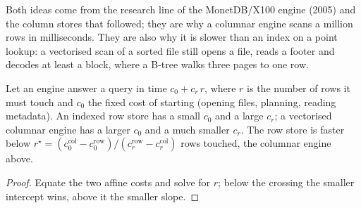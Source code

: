 Both ideas come from the research line of the MonetDB/X100 engine (2005) and the column stores that followed; they are why a
columnar engine scans a million rows in milliseconds. They are also why it is slower than an index on a point lookup: a
vectorised scan of a sorted file still opens a file, reads a footer and decodes at least a block, where a B-tree walks three
pages to one row.

\begin{omfigure}

\label{fig:pl:time-series-databases-and-the-alternatives:vector}
\end{omfigure}

\begin{proposition}\label{prop:pl:time-series-databases-and-the-alternatives:shapes}
Let an engine answer a query in time $c_0 + c_r\,r$, where $r$ is the number of rows it must touch and $c_0$ the fixed cost of
starting (opening files, planning, reading metadata). An indexed row store has a small $c_0$ and a large $c_r$; a vectorised
columnar engine has a larger $c_0$ and a much smaller $c_r$. The row store is faster below $r^\star = (c_0^{\mathrm{col}} -
c_0^{\mathrm{row}})/(c_r^{\mathrm{row}} - c_r^{\mathrm{col}})$ rows touched, the columnar engine above.
\end{proposition}

\begin{proof}
Equate the two affine costs and solve for $r$; below the crossing the smaller intercept wins, above it the smaller slope.
\end{proof}

